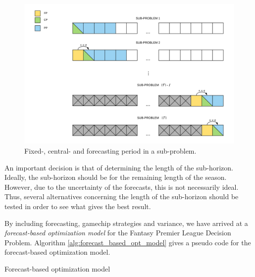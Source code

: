 \begin{figure}[H]
    \centering
    \includegraphics[scale = 0.47]{fig/chapter_5/rolling_horizon.png}
    \caption{Fixed-, central- and forecasting period in a sub-problem.}
    \label{fig:rolling_horizon}
\end{figure}

\newpar

An important decision is that of determining the length of the sub-horizon. Ideally, the sub-horizon should be for the remaining length of the season. However, due to the uncertainty of the forecasts, this is not necessarily ideal. Thus, several alternatives concerning the length of the sub-horizon should be tested in order to see what gives the best result. 

\newpar

By including forecasting, gamechip strategies and variance, we have arrived at a \textit{forecast-based optimization model} for the Fantasy Premier League Decision Problem. Algorithm \ref{alg:forecast_based_opt_model} gives a pseudo code for the forecast-based optimization model.


\newpar

\begin{algorithm}[H]
\caption{Forecast-based optimization model}
\begin{algorithmic}
    \EndIf
\EndWhile
\end{algorithmic}
\label{alg:forecast_based_opt_model}
\end{algorithm}



